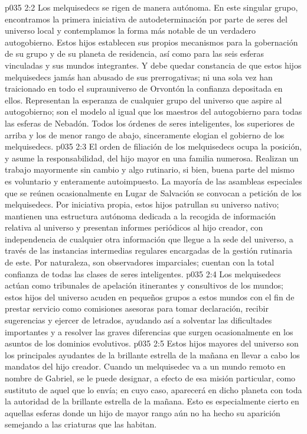 \vs p035 2:2 Los melquisedecs se rigen de manera autónoma. En este singular grupo, encontramos la primera iniciativa de autodeterminación por parte de seres del universo local y contemplamos la forma más notable de un verdadero autogobierno. Estos hijos establecen sus propios mecanismos para la gobernación de su grupo y de su planeta de residencia, así como para las seis esferas vinculadas y sus mundos integrantes. Y debe quedar constancia de que estos hijos melquisedecs jamás han abusado de sus prerrogativas; ni una sola vez han traicionado en todo el suprauniverso de Orvontón la confianza depositada en ellos. Representan la esperanza de cualquier grupo del universo que aspire al autogobierno; son el modelo al igual que los maestros del autogobierno para todas las esferas de Nebadón. Todos los órdenes de seres inteligentes, los superiores de arriba y los de menor rango de abajo, sinceramente elogian el gobierno de los melquisedecs.
\vs p035 2:3 \pc El orden de filiación de los melquisedecs ocupa la posición, y asume la responsabilidad, del hijo mayor en una familia numerosa. Realizan un trabajo mayormente sin cambio y algo rutinario, si bien, buena parte del mismo es voluntario y enteramente autoimpuesto. La mayoría de las asambleas especiales que se reúnen ocasionalmente en Lugar de Salvación se convocan a petición de los melquisedecs. Por iniciativa propia, estos hijos patrullan su universo nativo; mantienen una estructura autónoma dedicada a la recogida de información relativa al universo y presentan informes periódicos al hijo creador, con independencia de cualquier otra información que llegue a la sede del universo, a través de las instancias intermedias regulares encargadas de la gestión rutinaria de este. Por naturaleza, son observadores imparciales; cuentan con la total confianza de todas las clases de seres inteligentes.
\vs p035 2:4 Los melquisedecs actúan como tribunales de apelación itinerantes y consultivos de los mundos; estos hijos del universo acuden en pequeños grupos a estos mundos con el fin de prestar servicio como comisiones asesoras para tomar declaración, recibir sugerencias y ejercer de letrados, ayudando así a solventar las dificultades importantes y a resolver las graves diferencias que surgen ocasionalmente en los asuntos de los dominios evolutivos.
\vs p035 2:5 Estos hijos mayores del universo son los principales ayudantes de la brillante estrella de la mañana en llevar a cabo los mandatos del hijo creador. Cuando un melquisedec va a un mundo remoto en nombre de Gabriel, se le puede designar, a efecto de esa misión particular, como sustituto de aquel que lo envía; en cuyo caso, aparecerá en dicho planeta con toda la autoridad de la brillante estrella de la mañana. Esto es especialmente cierto en aquellas esferas donde un hijo de mayor rango aún no ha hecho su aparición semejando a las criaturas que las habitan.
